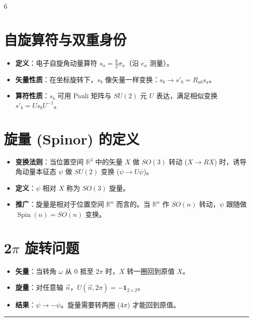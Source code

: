 \documentclass[landscape]{article}
\begin{document}
\begin{multicols*}{6}
\section*{自旋算符与双重身份}
\begin{itemize}
  \item \textbf{定义}：电子自旋角动量算符 $s_a = \frac{\hbar}{2}\sigma_a$（沿 $e_a$ 测量）。
  \item \textbf{矢量性质}：在坐标旋转下，$s_b$ 像矢量一样变换：$s_b \to s'_b = R_{ab}s_a$。
  \item \textbf{算符性质}：$s_b$ 可用 Pauli 矩阵与 $SU(2)$ 元 $U$ 表达，满足相似变换 $s'_b = U s_b U^{-1}$。
\end{itemize}

\section*{旋量 (Spinor) 的定义}
\begin{itemize}
  \item \textbf{变换法则}：当位置空间 $\mathbb{R}^3$ 中的矢量 $X$ 做 $SO(3)$ 转动 ($X \to RX$) 时，诱导角动量本征态 $\psi$ 做 $SU(2)$ 变换 ($\psi \to U\psi$)。
  \item \textbf{定义}：$\psi$ 相对 $X$ 称为 $SO(3)$ 旋量。
  \item \textbf{推广}：旋量是相对于位置空间 $\mathbb{R}^n$ 而言的。当 $\mathbb{R}^n$ 作 $SO(n)$ 转动，$\psi$ 跟随做 $\operatorname{Spin}(n)=\widetilde{SO(n)}$ 变换。
\end{itemize}

\section*{2$\pi$ 旋转问题}
\begin{itemize}
  \item \textbf{矢量}：当转角 $\omega$ 从 $0$ 抵至 $2\pi$ 时，$X$ 转一圈回到原值 $X$。
  \item \textbf{旋量}：对任意轴 $\vec{n}$，$U(\vec{n}, 2\pi) = -\mathbf{1}_{2\times 2}$。
  \item \textbf{结果}：$\psi \to -\psi$。旋量需要转两圈 ($4\pi$) 才能回到原值。
\end{itemize}
\noindent\textcolor{blue}{\rule{\linewidth}{1pt}}

\end{multicols*}
\end{document}
